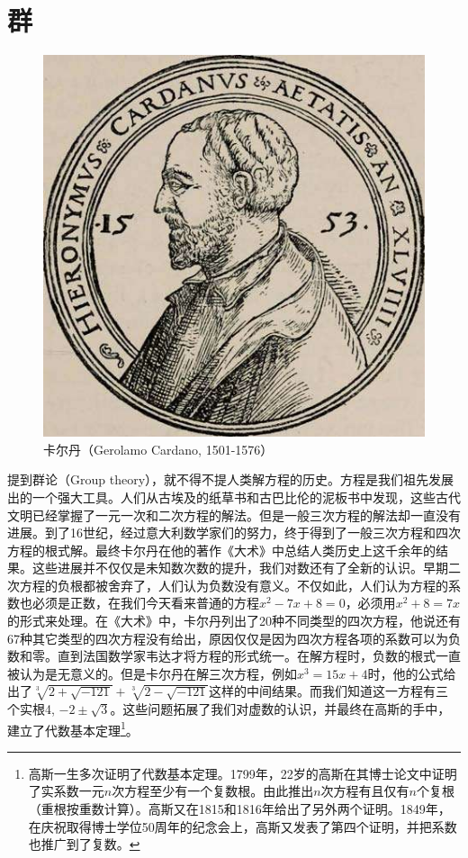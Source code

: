 \documentclass[b5paper]{ctexart}
\begin{document}
\section{群}

\begin{figure}[htbp]
 \centering
 \includegraphics[scale=0.3]{img/Cardano.jpg}
 \captionsetup{labelformat=empty}
 \caption{卡尔丹（Gerolamo Cardano, 1501-1576）}
 \label{fig:Cardano}
\end{figure}

提到群论（Group theory），就不得不提人类解方程的历史。方程是我们祖先发展出的一个强大工具。人们从古埃及的纸草书和古巴比伦的泥板书中发现，这些古代文明已经掌握了一元一次和二次方程的解法。但是一般三次方程的解法却一直没有进展。到了16世纪，经过意大利数学家们的努力，终于得到了一般三次方程和四次方程的根式解。最终卡尔丹在他的著作《大术》中总结人类历史上这千余年的结果。这些进展并不仅仅是未知数次数的提升，我们对数还有了全新的认识。早期二次方程的负根都被舍弃了，人们认为负数没有意义。不仅如此，人们认为方程的系数也必须是正数，在我们今天看来普通的方程$x^2 - 7x + 8 = 0$，必须用$x^2 + 8 = 7x$的形式来处理。在《大术》中，卡尔丹列出了20种不同类型的四次方程，他说还有67种其它类型的四次方程没有给出，原因仅仅是因为四次方程各项的系数可以为负数和零\cite{HanXueTao2012}。直到法国数学家韦达才将方程的形式统一。在解方程时，负数的根式一直被认为是无意义的。但是卡尔丹在解三次方程，例如$x^3 = 15x +4$时，他的公式给出了$\sqrt[3]{2 + \sqrt{-121}} + \sqrt[3]{2 - \sqrt{-121}}$这样的中间结果。而我们知道这一方程有三个实根4, $-2 \pm \sqrt{3}$。这些问题拓展了我们对虚数的认识，并最终在高斯的手中，建立了代数基本定理\footnote{高斯一生多次证明了代数基本定理。1799年，22岁的高斯在其博士论文中证明了实系数一元$n$次方程至少有一个复数根。由此推出$n$次方程有且仅有$n$个复根（重根按重数计算）。高斯又在1815和1816年给出了另外两个证明。1849年，在庆祝取得博士学位50周年的纪念会上，高斯又发表了第四个证明，并把系数也推广到了复数。}。
\end{document}

